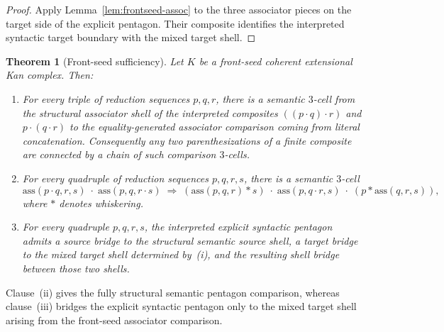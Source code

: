 \documentclass[webpdf,traditional,large,numbered]{oup-authoring-template}
\theoremstyle{thmstyleone}%
\newtheorem{theorem}{Theorem}[section]
\theoremstyle{thmstyletwo}%
\theoremstyle{thmstylethree}%
\newcommand{\ass}{\mathrm{ass}}
\begin{document}
\begin{proof}
Apply Lemma~\ref{lem:frontseed-assoc} to the three associator pieces on the
target side of the explicit pentagon.  Their composite identifies the
interpreted syntactic target boundary with the mixed target shell.
\end{proof}

\begin{theorem}[Front-seed sufficiency]
\label{thm:B}
Let $K$ be a front-seed coherent extensional Kan complex.  Then:
\begin{enumerate}[label=(\roman*)]
  \item For every triple of reduction sequences $p,q,r$, there is a semantic
    $3$-cell from the structural associator shell of the interpreted composites
    $((p\cdot q)\cdot r)$ and $p\cdot(q\cdot r)$ to the
    equality-generated associator comparison coming from literal concatenation.
    Consequently any two parenthesizations of a finite composite are connected
    by a chain of such comparison $3$-cells.
  \item For every quadruple of reduction sequences $p,q,r,s$, there is a
    semantic $3$-cell
    \[
    \ass(p\cdot q,r,s)\;\cdot\;\ass(p,q,r\cdot s)
    \;\Longrightarrow\;
    (\ass(p,q,r)\ast s)\;\cdot\;\ass(p,q\cdot r,s)\;\cdot\;(p\ast\ass(q,r,s)),
    \]
    where $\ast$ denotes whiskering.
  \item For every quadruple $p,q,r,s$, the interpreted explicit syntactic
    pentagon admits a source bridge to the structural semantic source shell, a
    target bridge to the mixed target shell determined by~(i), and the
    resulting shell bridge between those two shells.
\end{enumerate}
\end{theorem}

Clause~(ii) gives the fully structural semantic pentagon comparison, whereas
clause~(iii) bridges the explicit syntactic pentagon only to the mixed target
shell arising from the front-seed associator comparison.
\end{document}
